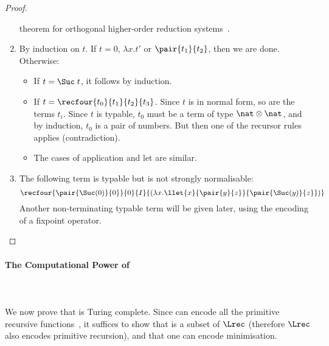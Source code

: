 \documentclass{article}
\begin{document}
\begin{proof}
\begin{enumerate}
theorem for orthogonal higher-order reduction systems~\cite{KlopJW:crs}.
\item
By induction on $t$. 
If $t = 0$, $\lambda x.t'$ or $\pair{t_1}{t_2}$, then we are done. Otherwise:
\begin{itemize}
\item If $t=\Suc\;t$, it follows by induction. 
\item If $t = \recfour{t_0}{t_1}{t_2}{t_3}$. Since $t$ is in normal form, so are
the terms $t_i$.  Since $t$ is typable, $t_0$ must be a term of type
$\nat \otimes \nat$, and by induction, $t_0$ is a pair of numbers. But
then one of the recursor rules applies (contradiction).
\item
The cases of application and let are similar.
\end{itemize}
\item
The following term is typable but is not strongly normalisable:
$$\recfour{\pair{\Suc(0)}{0}}{0}{I}{(\lambda x. \llet{x}{\pair{y}{z}}
{\pair{\Suc(y)}{z}})}$$
Another non-terminating typable term will be given later, using the encoding of a fixpoint operator.
\end{enumerate}
\end{proof}

\paragraph*{The Computational Power of \LLCIrec}\label{sec:LLCIrecpow}\ \\\ \\
We now prove that \LLCIrec is Turing complete. Since  \LLCI can encode all the primitive recursive functions~\cite{AlvesS:phd,AlvesS:TCS}, it suffices to show that \LLCI is a subset of $\Lrec$ (therefore $\Lrec$ also encodes primitive recursion), and that one can encode minimisation.
\end{document}
